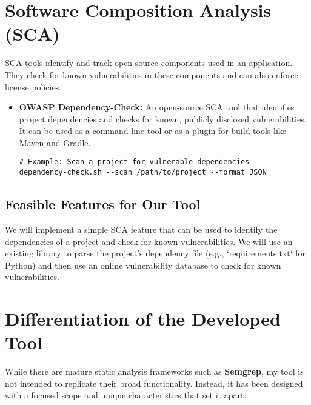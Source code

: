 \section{Software Composition Analysis (SCA)}
SCA tools identify and track open-source components used in an application. They check for known vulnerabilities in these components and can also enforce license policies.

\begin{itemize}
    \item \textbf{OWASP Dependency-Check:} An open-source SCA tool that identifies project dependencies and checks for known, publicly disclosed vulnerabilities. It can be used as a command-line tool or as a plugin for build tools like Maven and Gradle.
    \begin{verbatim}
# Example: Scan a project for vulnerable dependencies
dependency-check.sh --scan /path/to/project --format JSON
    \end{verbatim}
\end{itemize}

\subsection{Feasible Features for Our Tool}
We will implement a simple SCA feature that can be used to identify the dependencies of a project and check for known vulnerabilities. We will use an existing library to parse the project's dependency file (e.g., `requirements.txt` for Python) and then use an online vulnerability database to check for known vulnerabilities.

\section{Differentiation of the Developed Tool}

While there are mature static analysis frameworks such as \textbf{Semgrep}, my tool is not intended to replicate their broad functionality. Instead, it has been designed with a focused scope and unique characteristics that set it apart:

